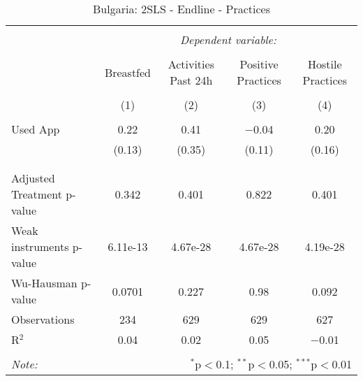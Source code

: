 
\begin{table}[!htbp] \centering 
  \caption{Bulgaria: 2SLS - Endline - Practices} 
  \label{tbl:Bulgaria: 2SLS - Endline - Practices} 
\begin{tabular}{@{\extracolsep{5pt}}lcccc} 
\\[-1.8ex]\hline 
\hline \\[-1.8ex] 
 & \multicolumn{4}{c}{\textit{Dependent variable:}} \\ 
\cline{2-5} 
\\[-1.8ex] & Breastfed & Activities Past 24h & Positive Practices & Hostile Practices \\ 
\\[-1.8ex] & (1) & (2) & (3) & (4)\\ 
\hline \\[-1.8ex] 
 Used App & 0.22 & 0.41 & $-$0.04 & 0.20 \\ 
  & (0.13) & (0.35) & (0.11) & (0.16) \\ 
  & & & & \\ 
\hline \\[-1.8ex] 
Adjusted Treatment p-value & 0.342 & 0.401 & 0.822 & 0.401 \\ 
Weak instruments p-value & 6.11e-13 & 4.67e-28 & 4.67e-28 & 4.19e-28 \\ 
Wu-Hausman p-value & 0.0701 & 0.227 & 0.98 & 0.092 \\ 
Observations & 234 & 629 & 629 & 627 \\ 
R$^{2}$ & 0.04 & 0.02 & 0.05 & $-$0.01 \\ 
\hline 
\hline \\[-1.8ex] 
\textit{Note:}  & \multicolumn{4}{r}{$^{*}$p$<$0.1; $^{**}$p$<$0.05; $^{***}$p$<$0.01} \\ 
\end{tabular} 
\end{table} 
